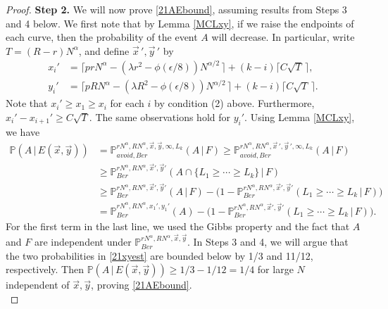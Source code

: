 \begin{proof}
		\noindent\textbf{Step 2.} We will now prove \eqref{21AEbound}, assuming results from Steps 3 and 4 below. We first note that by Lemma \ref{MCLxy}, if we raise the endpoints of each curve, then the probability of the event $A$ will decrease. In particular, write $T = (R-r)N^\alpha$, and define $\vec{x}\,',\vec{y}\,'$ by
		\begin{align*}
		x_i' &= \lceil prN^\alpha - (\lambda r^2 - \phi(\epsilon/8))N^{\alpha/2}\,\rceil + (k-i)\lceil C\sqrt{T}\,\rceil,\\
		y_i' &= \lceil pRN^\alpha - (\lambda R^2 - \phi(\epsilon/8))N^{\alpha/2}\,\rceil + (k-i)\lceil C\sqrt{T}\,\rceil.
		\end{align*}
		Note that $x_i' \geq x_1 \geq x_i$ for each $i$ by condition (2) above. Furthermore, $x_i' - x_{i+1}' \geq C\sqrt{T}$. The same observations hold for $y_i'$. Using Lemma \ref{MCLxy}, we have
		\begin{align}
		\mathbb{P}(A\,|\,E(\vec{x},\vec{y})) &= \mathbb{P}^{rN^\alpha, RN^\alpha,\vec{x},\vec{y},\infty,L_k}_{avoid,Ber} (A\,|\,F) \geq \mathbb{P}^{rN^\alpha, RN^\alpha,\vec{x}\,',\vec{y}\,',\infty,L_k}_{avoid,Ber} (A\,|\,F) \nonumber \\
		&\geq \mathbb{P}^{rN^\alpha, RN^\alpha,\vec{x}',\vec{y}'}_{Ber} (A\cap\{L_1 \geq \cdots \geq L_k\}\,|\,F) \nonumber \\
		&\geq \mathbb{P}^{rN^\alpha, RN^\alpha,\vec{x}',\vec{y}'}_{Ber} (A\,|\,F) - \big( 1 - \mathbb{P}^{rN^\alpha, RN^\alpha,\vec{x}',\vec{y}'}_{Ber} (L_1 \geq \cdots \geq L_k\,|\,F)\big) \nonumber\\
		&= \mathbb{P}^{rN^\alpha, RN^\alpha,x_1',y_1'}_{Ber} (A) - \big( 1 - \mathbb{P}^{rN^\alpha, RN^\alpha,\vec{x}',\vec{y}'}_{Ber} (L_1 \geq \cdots \geq L_k\,|\,F)\big). \label{21xyest}
		\end{align}
		For the first term in the last line, we used the Gibbs property and the fact that $A$ and $F$ are independent under $\mathbb{P}^{rN^\alpha, RN^\alpha,\vec{x},\vec{y}}_{Ber}$. In Steps 3 and 4, we will argue that the two probabilities in \eqref{21xyest} are bounded below by 1/3 and 11/12, respectively. Then $\mathbb{P}(A\,|\,E(\vec{x},\vec{y})) \geq 1/3 - 1/12 = 1/4$ for large $N$ independent of $\vec{x},\vec{y}$, proving \eqref{21AEbound}.\\
		

\end{proof}
